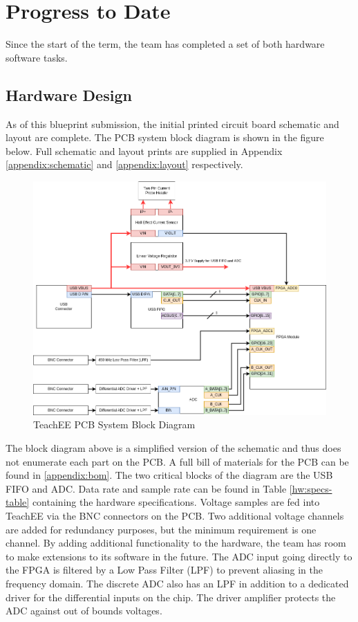 \documentclass[letterpaper,12pt]{article}
\begin{document}
\section{Progress to Date} %
Since the start of the term, the team has completed a set of both hardware
software tasks.

\subsection{Hardware Design}
As of this blueprint submission, the initial printed circuit board schematic and
layout are complete. The PCB system block diagram is shown in the figure below.
Full schematic and layout prints are supplied in Appendix
\ref{appendix:schematic} and \ref{appendix:layout} respectively.
\begin{figure}[H]
    \centering
    \includegraphics[width=16cm]{../../misc/TeachEE-System-Diagram.drawio.png}
    \caption{TeachEE PCB System Block Diagram}
    \label{fig:pcb-block-diagram}
\end{figure}

The block diagram above is a simplified version of the schematic and thus does
not enumerate each part on the PCB. A full bill of materials for the PCB can be
found in \ref{appendix:bom}. The two critical blocks of the diagram are the USB
FIFO and ADC. Data rate and sample rate can be found in Table
\ref{hw:specs-table} containing the hardware specifications. Voltage samples are
fed into TeachEE via the BNC connectors on the PCB. Two additional voltage
channels are added for redundancy purposes, but the minimum requirement is one
channel. By adding additional functionality to the hardware, the team has room
to make extensions to its software in the future. The ADC input going directly
to the FPGA is filtered by a Low Pass Filter (LPF) to prevent aliasing in the
frequency domain. The discrete ADC also has an LPF in addition to a dedicated
driver for the differential inputs on the chip. The driver amplifier protects
the ADC against out of bounds voltages.
\end{document}
